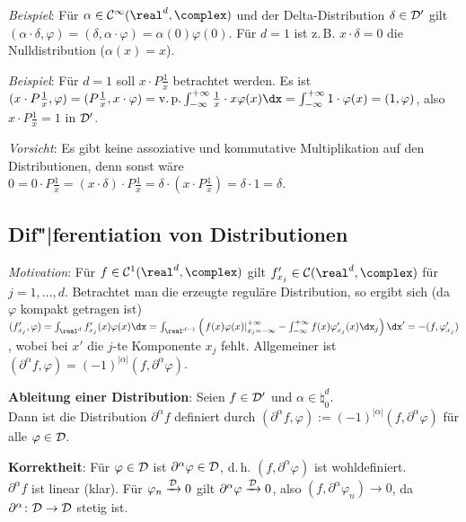 \emph{Beispiel}:
Für $\alpha \in \C^\infty(\real^d, \complex)$ und der Delta-Distribution
$\delta \in \mathcal{D}'$ gilt $(\alpha \cdot \delta, \varphi) =
(\delta, \alpha \cdot \varphi) = \alpha(0) \varphi(0)$.
Für $d = 1$ ist z.\,B. $x \cdot \delta = 0$ die Nulldistribution
($\alpha(x) = x$).

\emph{Beispiel}:
Für $d = 1$ soll $x \cdot P \frac{1}{x}$ betrachtet werden.
Es ist\\
$(x \cdot P \frac{1}{x}, \varphi) = (P \frac{1}{x}, x \cdot \varphi) =
\vp\int_{-\infty}^{+\infty} \frac{1}{x} \cdot x \varphi(x) \dx =
\int_{-\infty}^{+\infty} 1 \cdot \varphi(x) = (1, \varphi)$, also
$x \cdot P \frac{1}{x} = 1$ in $\mathcal{D}'$.

\emph{Vorsicht}:
Es gibt keine assoziative und kommutative Multiplikation auf den
Distributionen, denn sonst wäre
$0 = 0 \cdot P \frac{1}{x} = (x \cdot \delta) \cdot P \frac{1}{x} =
\delta \cdot (x \cdot P \frac{1}{x}) = \delta \cdot 1 = \delta$.

\pagebreak

\subsection{%
    Dif"|ferentiation von Distributionen%
}

\emph{Motivation}:
Für $f \in \C^1(\real^d, \complex)$ gilt
$f'_{x_j} \in \C(\real^d, \complex)$ für $j = 1, \dotsc, d$.
Betrachtet man die erzeugte reguläre Distribution, so ergibt sich
(da $\varphi$ kompakt getragen ist)\\
$(f'_{x_j}, \varphi) = \int_{\real^d} f'_{x_j}(x) \varphi(x) \dx =
\int_{\real^{d-1}} \left(\left.f(x) \varphi(x)\right|_{x_j=-\infty}^{+\infty} -
\int_{-\infty}^{+\infty} f(x) \varphi'_{x_j}(x) \dx_j\right) \dx' =
-(f, \varphi'_{x_j})$, wobei bei $x'$ die $j$-te Komponente $x_j$ fehlt.
Allgemeiner ist $(\partial^\alpha f, \varphi) =
(-1)^{|\alpha|} (f, \partial^\alpha \varphi)$.

\textbf{Ableitung einer Distribution}:
Seien $f \in \mathcal{D}'$ und $\alpha \in \natural_0^d$.\\
Dann ist die Distribution $\partial^\alpha f$ definiert durch
$(\partial^\alpha f, \varphi) := (-1)^{|\alpha|} (f, \partial^\alpha \varphi)$
für alle $\varphi \in \mathcal{D}$.

\textbf{Korrektheit}:
Für $\varphi \in \mathcal{D}$ ist $\partial^\alpha \varphi \in \mathcal{D}$, d.\,h.
$(f, \partial^\alpha \varphi)$ ist wohldefiniert.\\
$\partial^\alpha f$ ist linear (klar).
Für $\varphi_n \xrightarrow{\mathcal{D}} 0$ gilt
$\partial^\alpha \varphi \xrightarrow{\mathcal{D}} 0$, also
$(f, \partial^\alpha \varphi_n) \to 0$, da
$\partial^\alpha\colon \mathcal{D} \rightarrow \mathcal{D}$ stetig ist.


